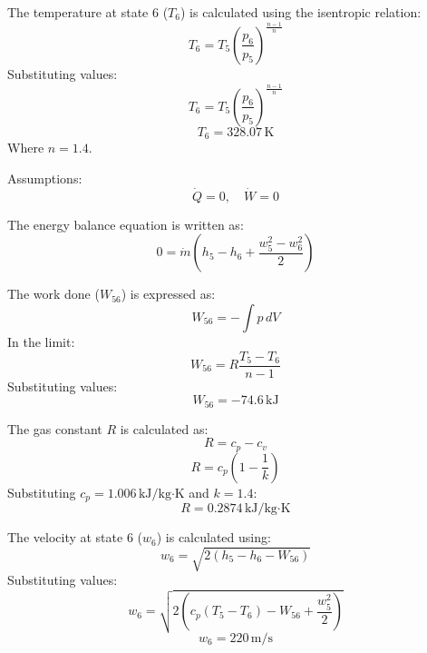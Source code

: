 The temperature at state 6 (\(T_6\)) is calculated using the isentropic relation:  
\[
T_6 = T_5 \left( \frac{p_6}{p_5} \right)^{\frac{n-1}{n}}
\]  
Substituting values:  
\[
T_6 = T_5 \left( \frac{p_6}{p_5} \right)^{\frac{n-1}{n}}
\]  
\[
T_6 = 328.07 \, \text{K}
\]  
Where \(n = 1.4\).  

Assumptions:  
\[
\dot{Q} = 0, \quad \dot{W} = 0
\]  

The energy balance equation is written as:  
\[
0 = \dot{m} \left( h_5 - h_6 + \frac{w_5^2 - w_6^2}{2} \right)
\]  

The work done (\(W_{56}\)) is expressed as:  
\[
W_{56} = -\int p \, dV
\]  
In the limit:  
\[
W_{56} = R \frac{T_5 - T_6}{n-1}
\]  
Substituting values:  
\[
W_{56} = -74.6 \, \text{kJ}
\]  

The gas constant \(R\) is calculated as:  
\[
R = c_p - c_v
\]  
\[
R = c_p \left( 1 - \frac{1}{k} \right)
\]  
Substituting \(c_p = 1.006 \, \text{kJ/kg·K}\) and \(k = 1.4\):  
\[
R = 0.2874 \, \text{kJ/kg·K}
\]  

The velocity at state 6 (\(w_6\)) is calculated using:  
\[
w_6 = \sqrt{2 \left( h_5 - h_6 - W_{56} \right)}
\]  
Substituting values:  
\[
w_6 = \sqrt{2 \left( c_p \left( T_5 - T_6 \right) - W_{56} + \frac{w_5^2}{2} \right)}
\]  
\[
w_6 = 220 \, \text{m/s}
\]